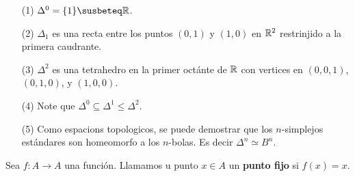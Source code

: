 \begin{example}\label{exmp_2}
    \begin{enumerate}
        \item[(1)] $\Delta^0=\{1\} \susbeteq \R$.

        \item[(2)] $\Delta_1$ es una recta entre los puntos $(0,1)$ y $(1,0)$ en
            $\mathbb{R}^2$ restrinjido a la primera caudrante.

        \item[(3)] $\Delta^2$ es una tetrahedro en la primer oct\'ante de  $\mathbb{R}$
            con vertices en  $(0,0,1)$, $(0,1,0)$, y $(1,0,0)$.

        \item[(4)] Note que $\Delta^0 \subseteq \Delta^1 \leq \Delta^2$.

        \item[(5)] Como espacions topologicos, se puede demostrar que los
            $n$-simplejos est\'andares son homeomorfo a los  $n$-bolas. Es decir
             $\Delta^n \simeq B^n$.
    \end{enumerate}
\end{example}

\begin{definition}
    Sea $f:A \rightarrow A$ una funci\'on. Llamamos u punto $x \in A$ un
    \textbf{punto fijo} si $f(x)=x$.
\end{definition}

